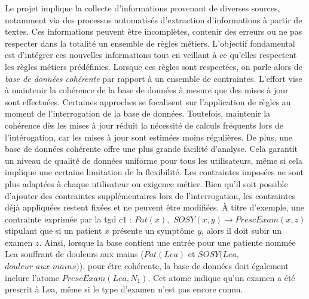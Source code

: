 Le projet implique la collecte d'informations provenant de diverses sources, notamment via des processus automatisés d'extraction d'informations à partir de textes.
Ces informations peuvent être incomplètes, contenir des erreurs ou ne pas respecter dans la totalité un ensemble de règles métiers.
L'objectif fondamental est d'intégrer ces nouvelles informations tout en veillant à ce qu'elles respectent les règles métiers prédéfinies.
Lorsque ces règles sont respectées, on parle alors de \emph{base de données cohérente} par rapport à un ensemble de contraintes.
L'effort vise à maintenir la cohérence de la base de données à mesure que des mises à jour sont effectuées.
Certaines approches se focalisent sur l'application de règles au moment de l'interrogation de la base de données.
Toutefois, maintenir la cohérence dès les mises à jour réduit la nécessité de calculs fréquents lors de l'intérogation, car les mises à jour sont estimées moins régulières.
De plus, une base de données cohérente offre une plus grande facilité d'analyse. %
Cela garantit un niveau de qualité de données uniforme pour tous les utilisateurs, même si cela implique une certaine limitation de la flexibilité.
Les contraintes imposées ne sont plus adaptées à chaque utilisateur ou exigence métier.
Bien qu'il soit possible d'ajouter des contraintes supplémentaires lors de l'interrogation, les contraintes déjà appliquées restent fixées et ne peuvent être modifiées.
À titre d'exemple, une contrainte exprimée par la \gls{tgd} $c1$ : $Pat(x),$ $SOSY(x, y) \rightarrow PrescExam(x, z)$ stipulant que si un patient $x$ présente un symptôme $y$, alors il doit subir un examen $z$.
Ainsi, lorsque la base contient une entrée pour une patiente nommée Lea souffrant de douleurs aux mains ($Pat(Lea)$ et $ SOSY(Lea,$ $\textit{douleur aux mains})$), pour étre cohérente, la base de données doit également inclure l'atome $PrescExam(Lea, N_1)$.
Cet atome indique qu'un examen a été prescrit à Lea, même si le type d'examen n'est pas encore connu.

